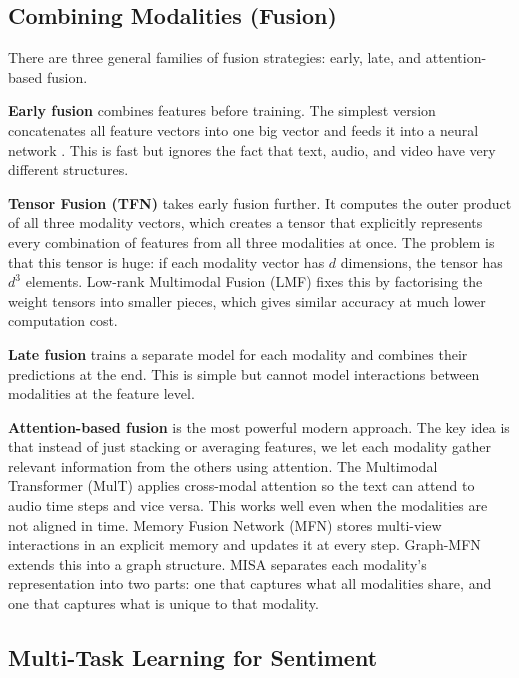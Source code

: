 \documentclass[11pt,twocolumn]{article}
\begin{document}
\subsection{Combining Modalities (Fusion)}

There are three general families of fusion strategies: early, late, and attention-based fusion.

\textbf{Early fusion} combines features before training. The simplest version concatenates all feature vectors into one big vector and feeds it into a neural network \citep{zadeh2016multimodal}. This is fast but ignores the fact that text, audio, and video have very different structures.

\textbf{Tensor Fusion (TFN)} \citep{zadeh2017tensor} takes early fusion further. It computes the outer product of all three modality vectors, which creates a tensor that explicitly represents every combination of features from all three modalities at once. The problem is that this tensor is huge: if each modality vector has $d$ dimensions, the tensor has $d^3$ elements. Low-rank Multimodal Fusion (LMF) \citep{liu2018efficient} fixes this by factorising the weight tensors into smaller pieces, which gives similar accuracy at much lower computation cost.

\textbf{Late fusion} trains a separate model for each modality and combines their predictions at the end. This is simple but cannot model interactions between modalities at the feature level.

\textbf{Attention-based fusion} is the most powerful modern approach. The key idea is that instead of just stacking or averaging features, we let each modality gather relevant information from the others using attention. The Multimodal Transformer (MulT) \citep{tsai2019multimodal} applies cross-modal attention so the text can attend to audio time steps and vice versa. This works well even when the modalities are not aligned in time. Memory Fusion Network (MFN) \citep{zadeh2018memory} stores multi-view interactions in an explicit memory and updates it at every step. Graph-MFN \citep{zadeh2018multimodal} extends this into a graph structure. MISA \citep{hazarika2021misa} separates each modality's representation into two parts: one that captures what all modalities share, and one that captures what is unique to that modality.

\subsection{Multi-Task Learning for Sentiment}
\end{document}
